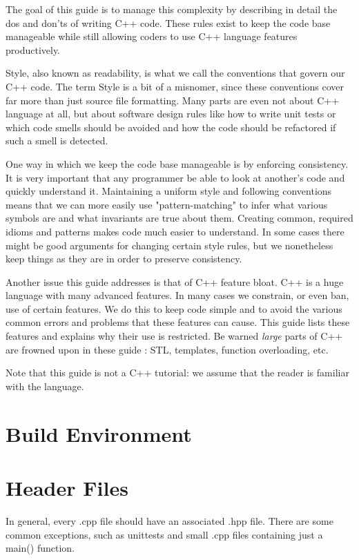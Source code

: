 \documentclass[11pt]{report}
\begin{document}
The goal of this guide is to manage this complexity by describing in detail the dos and don'ts of writing C++ code. These rules exist to keep the code base manageable while still allowing coders to use C++ language features productively.

Style, also known as readability, is what we call the conventions that govern our C++ code. The term Style is a bit of a misnomer, since these conventions cover far more than just source file formatting. Many parts are even not about C++ language at all, but about software design rules like how to write unit tests or which code smells should be avoided and how the code should be refactored if such a smell is detected.

One way in which we keep the code base manageable is by enforcing consistency. It is very important that any programmer be able to look at another's code and quickly understand it. Maintaining a uniform style and following conventions means that we can more easily use "pattern-matching" to infer what various symbols are and what invariants are true about them. Creating common, required idioms and patterns makes code much easier to understand. In some cases there might be good arguments for changing certain style rules, but we nonetheless keep things as they are in order to preserve consistency.

Another issue this guide addresses is that of C++ feature bloat. C++ is a huge language with many advanced features. In many cases we constrain, or even ban, use of certain features. We do this to keep code simple and to avoid the various common errors and problems that these features can cause. This guide lists these features and explains why their use is restricted. Be warned \emph{large} parts of C++ are frowned upon in these guide : STL, templates, function overloading, etc.


Note that this guide is not a C++ tutorial: we assume that the reader is familiar with the language.

\chapter{Build Environment}

\chapter{Header Files}

In general, every .cpp file should have an associated .hpp file. There are some common exceptions, such as unittests and small .cpp files containing just a main() function.
\end{document}
